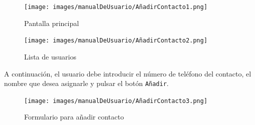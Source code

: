 \begin{figure}[H]
    \centering
    \begin{minipage}[b]{0.48\textwidth}
        \centering
        \texttt{[image: images/manualDeUsuario/AñadirContacto1.png]}
        \caption*{Pantalla principal}
    \end{minipage}
    \hfill
    \begin{minipage}[b]{0.48\textwidth}
        \centering
        \texttt{[image: images/manualDeUsuario/AñadirContacto2.png]}
        \caption*{Lista de usuarios}
    \end{minipage}
\end{figure}

A continuación, el usuario debe introducir el número de teléfono del contacto, el nombre que desea asignarle y pulsar el botón \texttt{Añadir}.

\begin{figure}[H]
    \centering
    \texttt{[image: images/manualDeUsuario/AñadirContacto3.png]}
    \caption*{Formulario para añadir contacto}
\end{figure}
